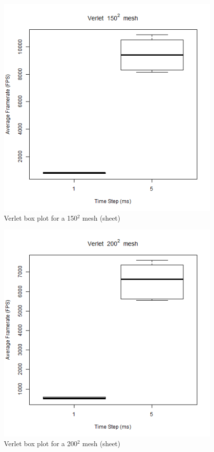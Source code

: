       \begin{figure}
    \begin{center}
      \includegraphics[scale=.9]{Figures/sheet_v_150_box}
    \end{center}
    \caption{Verlet box plot for a 150$^{2}$ mesh (sheet)}
    \label{fig:v box 150 sheet}
  \end{figure}
  
      \begin{figure}
    \begin{center}
      \includegraphics[scale=.9]{Figures/sheet_v_200_box}
    \end{center}
    \caption{Verlet box plot for a 200$^{2}$ mesh (sheet)}
    \label{fig:v box 200 sheet}
  \end{figure}
  
